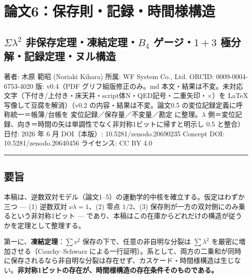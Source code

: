 \documentclass[
]{ltjsarticle}
\author{}
\date{}
\begin{document}
\section{論文6：保存則・記録・時間様構造}\label{ux8ad6ux65876ux4fddux5b58ux5247ux8a18ux9332ux6642ux9593ux69d8ux69cbux9020}

\subsection{\texorpdfstring{\(\Sigma\lambda^2\)
非保存定理・凍結定理・\(B_4\) ゲージ・\(1{+}3\)
極分解・記録定理・ヌル構造}{\textbackslash Sigma\textbackslash lambda\^{}2 非保存定理・凍結定理・B\_4 ゲージ・1\{+\}3 極分解・記録定理・ヌル構造}}\label{sigmalambda2-ux975eux4fddux5b58ux5b9aux7406ux51cdux7d50ux5b9aux7406b_4-ux30b2ux30fcux30b813-ux6975ux5206ux89e3ux8a18ux9332ux5b9aux7406ux30ccux30ebux69cbux9020}

著者: 木原 範昭 (Noriaki Kihara) 所属: WF System Co., Ltd. ORCID:
0009-0004-6753-4020 版: v0.4（PDF グリフ組版修正のみ。md
本文・結果は不変。未対応文字（下付き/上付き・床天井・script体N・QED記号・二重矢印・×）を
LaTeX 写像して豆腐を解消）（v0.2 の内容・結果は不変。論文0.5
の変位記録定義に呼称統一＝帳簿/台帳を 変位記録／保存量／不変量／勘定
に整理。\(\lambda\)
側＝変位記録、向き＝時間の矢は単調性でなく非対称1ビットに帰すと明示し
0.5 と整合） 日付: 2026 年 6 月 DOI（本版）: 10.5281/zenodo.20690235
Concept DOI: 10.5281/zenodo.20640456 ライセンス: CC BY 4.0

\begin{center}\rule{0.5\linewidth}{0.5pt}\end{center}

\subsection{要旨}\label{ux8981ux65e8}

本稿は、逆数双対モデル（論文1--5）の運動学的中核を確立する。仮定はわずか三つ
--- (1) 逆数双対 \(\nu\lambda=1\)、(2) 零点 \(1/2\)、(3)
保存則が一方の双対側にのみ乗るという非対称1ビット ---
であり、本稿はこの在庫からどれだけの構造が従うかを定理として整理する。

第一に、\textbf{凍結定理}：\(\sum\nu^2\)
保存の下で、任意の非自明な分裂は \(\sum\lambda^2\)
を厳密に増加させる（Cauchy--Schwarz
による一行証明）。系として、両方の二乗和が同時に保存されるなら非自明な分裂は存在せず、カスケード・時間様構造は生じない。\textbf{非対称1ビットの存在が、時間様構造の存在条件そのものである。}
\end{document}
